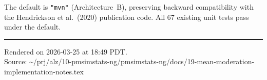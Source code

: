 \documentclass[11pt]{article}
\begin{document}
The default is \texttt{"mvn"} (Architecture~B), preserving
backward compatibility with the Hendrickson et al.\ (2020)
publication code. All 67 existing unit tests pass under the
default.

\vfill

\noindent\rule{\textwidth}{0.4pt}

{\footnotesize
Rendered on 2026-03-25 at 18:49 PDT.\\
Source: \textasciitilde/prj/alz/10-pmsimstats-ng/pmsimstats-ng/docs/19-mean-moderation-implementation-notes.tex}
\end{document}
